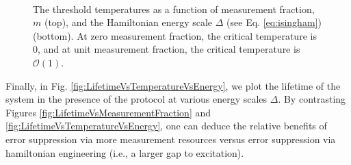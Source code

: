 \documentclass[twocolumn,superscriptaddress,aps,prb,floatfix]{revtex4-1}
\begin{document}
\begin{figure}
\begin{center}
\\
\vspace{-1.2\baselineskip}
\end{center}
\caption[justification=raggedright]{The threshold temperatures as a function of measurement fraction, $m$ (top),  and the Hamiltonian energy scale $\Delta$ (see Eq. \ref{eq:isingham})(bottom).  At zero measurement fraction, the critical temperature is 0, and at unit measurement fraction, the critical temperature is $\mathcal{O}(1)$.}
\label{fig:CriticalTempVsMeasurementFraction}
\end{figure}



Finally, in Fig. \ref{fig:LifetimeVsTemperatureVsEnergy}, we plot the lifetime of the system in the presence of the protocol at various energy scales $\Delta$.  By contrasting Figures \ref{fig:LifetimeVsMeasurementFraction} and \ref{fig:LifetimeVsTemperatureVsEnergy}, one can deduce the relative benefits of error suppression via more measurement resources versus error suppression via hamiltonian engineering (i.e., a larger gap to excitation).
\end{document}
